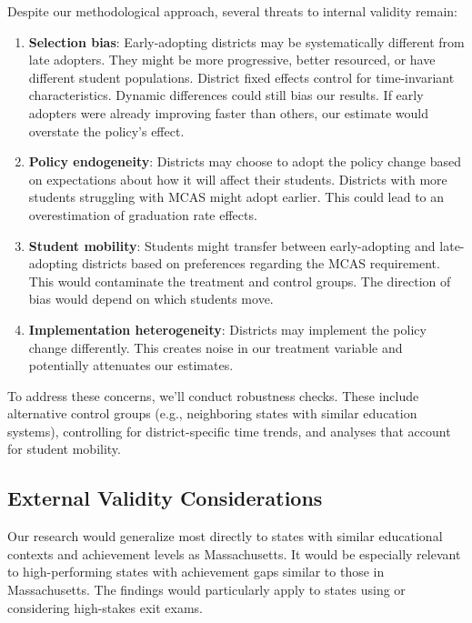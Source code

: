 \documentclass[12pt]{article}
\begin{document}
Despite our methodological approach, several threats to internal validity remain:

\begin{enumerate}
    \item \textbf{Selection bias}: Early-adopting districts may be systematically different from late adopters. They might be more progressive, better resourced, or have different student populations. District fixed effects control for time-invariant characteristics. Dynamic differences could still bias our results. If early adopters were already improving faster than others, our estimate would overstate the policy's effect.

    \item \textbf{Policy endogeneity}: Districts may choose to adopt the policy change based on expectations about how it will affect their students. Districts with more students struggling with MCAS might adopt earlier. This could lead to an overestimation of graduation rate effects.

    \item \textbf{Student mobility}: Students might transfer between early-adopting and late-adopting districts based on preferences regarding the MCAS requirement. This would contaminate the treatment and control groups. The direction of bias would depend on which students move.

    \item \textbf{Implementation heterogeneity}: Districts may implement the policy change differently. This creates noise in our treatment variable and potentially attenuates our estimates.
\end{enumerate}

To address these concerns, we'll conduct robustness checks. These include alternative control groups (e.g., neighboring states with similar education systems), controlling for district-specific time trends, and analyses that account for student mobility.

\subsection{External Validity Considerations}

Our research would generalize most directly to states with similar educational contexts and achievement levels as Massachusetts. It would be especially relevant to high-performing states with achievement gaps similar to those in Massachusetts. The findings would particularly apply to states using or considering high-stakes exit exams.
\end{document}
